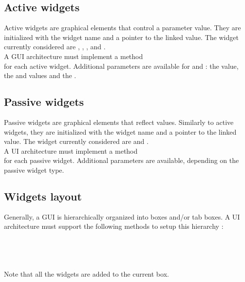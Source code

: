 \subsection{Active widgets}
\label{sec:awidget}
Active widgets are graphical elements that control a parameter value. They are initialized with the widget name and a pointer to the linked value.
The widget currently considered are ,  ,  ,   and  . \\
A GUI architecture must implement a method \\
 for each active widget.
Additional parameters are available for  and : the  value, the  and  values and the .

\subsection{Passive widgets}
\label{sec:pwidget}
Passive widgets are graphical elements that reflect values. Similarly to active widgets, they are initialized with the widget name and a pointer to the linked value.
The widget currently considered are   and  . \\
A UI architecture must implement a method \\
 for each passive widget.
Additional parameters are available, depending on the passive widget type.

\subsection{Widgets layout}
\label{sec:wlayout}
Generally, a  GUI is hierarchically organized into boxes and/or tab boxes. 
A UI architecture must support the following methods to setup this hierarchy : \\
\htab{} \\
\htab{} \\
\htab{} \\
\htab{} \\
Note that all the widgets are added to the current box.

